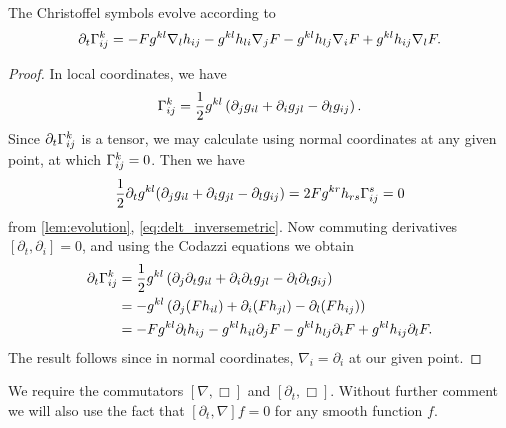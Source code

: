 \documentclass{amsart}
\begin{document}
\begin{lemma}
\label{EvGamma}
The Christoffel symbols evolve according to
\begin{equation}
\partial_t {\Gamma}^{k}_{ij} = -F g^{kl} \nabla_l h_{ij} - g^{kl} h_{li} \nabla_j F - g^{kl} h_{lj} \nabla_i F + g^{kl} h_{ij} \nabla_l F.
\end{equation}
\end{lemma}

\begin{proof}
In local coordinates, we have
\[
\Gamma^{k}_{ij} = \frac{1}{2} g^{kl} \left(\partial_j g_{il} + \partial_i g_{jl} - \partial_l g_{ij}\right).
\]
Since $\partial_t \Gamma^{k}_{ij}$ is a tensor, we may calculate using normal coordinates at any given point, at which \(\Gamma^k_{ij} = 0\). Then we have
\[
\frac{1}{2} \partial_t g^{kl} (\partial_j g_{il} + \partial_i g_{jl} - \partial_l g_{ij}) = 2F g^{kr} h_{rs} \Gamma^s_{ij} = 0
\]
from \cref{lem:evolution}, \cref{eq:delt_inversemetric}. Now commuting derivatives \([\partial_t, \partial_i] = 0\), and using the Codazzi equations we obtain
\[
\begin{split}
\partial_t {\Gamma}^{k}_{ij} & = \frac{1}{2} g^{kl} \left(\partial_j \partial_t g_{il} + \partial_i \partial_t g_{jl} - \partial_l \partial_t g_{ij}\right) \\
&= - g^{kl} \left(\partial_j (F h_{il}) + \partial_i (F h_{jl}) - \partial_l (F h_{ij})\right) \\
&= -F g^{kl} \partial_l h_{ij} - g^{kl} h_{il} \partial_j F  - g^{kl} h_{lj} \partial_i F + g^{kl} h_{ij} \partial_l F.
\end{split}
\]
The result follows since in normal coordinates, \(\nabla_i = \partial_i\) at our given point.
\end{proof}

We require the commutators \([\nabla, \Box]\) and \([\partial_t, \Box]\). Without further comment we will also use the fact that \([\partial_t, \nabla] f = 0\) for any smooth function \(f\).
\end{document}
